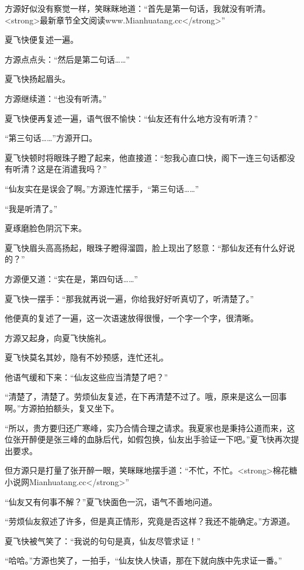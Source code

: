 
\begin{this_body}

方源好似没有察觉一样，笑眯眯地道：“首先是第一句话，我就没有听清。<strong>最新章节全文阅读www.Mianhuatang.cc</strong>”

夏飞快便复述一遍。

方源点点头：“然后是第二句话……”

夏飞快扬起眉头。

方源继续道：“也没有听清。”

夏飞快便再复述一遍，语气很不愉快：“仙友还有什么地方没有听清？”

“第三句话……”方源开口。

夏飞快顿时将眼珠子瞪了起来，他直接道：“恕我心直口快，阁下一连三句话都没有听清？这是在消遣我吗？”

“仙友实在是误会了啊。”方源连忙摆手，“第三句话……”

“我是听清了。”

夏琢磨脸色阴沉下来。

夏飞快眉头高高扬起，眼珠子瞪得溜圆，脸上现出了怒意：“那仙友还有什么好说的？”

方源便又道：“实在是，第四句话……”

夏飞快一摆手：“那我就再说一遍，你给我好好听真切了，听清楚了。”

他便真的复述了一遍，这一次语速放得很慢，一个字一个字，很清晰。

方源又起身，向夏飞快施礼。

夏飞快莫名其妙，隐有不妙预感，连忙还礼。

他语气缓和下来：“仙友这些应当清楚了吧？”

“清楚了，清楚了。劳烦仙友复述，在下再清楚不过了。哦，原来是这么一回事啊。”方源拍拍额头，复又坐下。

“所以，贵方要归还广寒峰，实乃合情合理之请求。我夏家也是秉持公道而来，这位张开醉便是张三峰的血脉后代，如假包换，仙友出手验证一下吧。”夏飞快再次提出要求。

但方源只是打量了张开醉一眼，笑眯眯地摆手道：“不忙，不忙。<strong>棉花糖小说网Mianhuatang.cc</strong>”

“仙友又有何事不解？”夏飞快面色一沉，语气不善地问道。

“劳烦仙友叙述了许多，但是真正情形，究竟是否这样？我还不能确定。”方源道。

夏飞快被气笑了：“我说的句句是真，仙友尽管求证！”

“哈哈。”方源也笑了，一拍手，“仙友快人快语，那在下就向族中先求证一番。”


\end{this_body}
